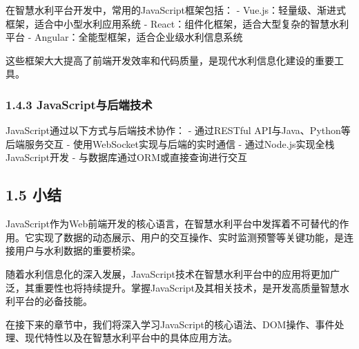 在智慧水利平台开发中，常用的JavaScript框架包括： -
Vue.js：轻量级、渐进式框架，适合中小型水利应用系统 -
React：组件化框架，适合大型复杂的智慧水利平台 -
Angular：全能型框架，适合企业级水利信息系统

这些框架大大提高了前端开发效率和代码质量，是现代水利信息化建设的重要工具。

\subsubsection{1.4.3
JavaScript与后端技术}\label{javascriptux4e0eux540eux7aefux6280ux672f}

JavaScript通过以下方式与后端技术协作： - 通过RESTful
API与Java、Python等后端服务交互 - 使用WebSocket实现与后端的实时通信 -
通过Node.js实现全栈JavaScript开发 - 与数据库通过ORM或直接查询进行交互

\subsection{1.5 小结}\label{ux5c0fux7ed3}

JavaScript作为Web前端开发的核心语言，在智慧水利平台中发挥着不可替代的作用。它实现了数据的动态展示、用户的交互操作、实时监测预警等关键功能，是连接用户与水利数据的重要桥梁。

随着水利信息化的深入发展，JavaScript技术在智慧水利平台中的应用将更加广泛，其重要性也将持续提升。掌握JavaScript及其相关技术，是开发高质量智慧水利平台的必备技能。

在接下来的章节中，我们将深入学习JavaScript的核心语法、DOM操作、事件处理、现代特性以及在智慧水利平台中的具体应用方法。

